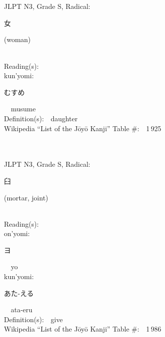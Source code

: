 \begin{multicols}{2}
\ \ \\
{\fontsize{34pt}{40pt}  }\ \ \\  %
{JLPT N3, Grade S, Radical:\ \ {\begin{CJK}{UTF8}{min} 女 \end{CJK}} (woman) } \\
Reading(s):\ \ \\
{\hspace*{1em}}kun'yomi:\ \ \\
{\hspace*{2em}}{\begin{CJK}{UTF8}{min} むすめ \end{CJK}}\ \ musume\ \ \\
Definition(s):\ \ daughter \\
Wikipedia ``List of the J\=oy\=o Kanji'' Table \#:\ \ 1\,925 \\
\ \ \\
{\fontsize{34pt}{40pt}  }\ \ \\  %
{JLPT N3, Grade S, Radical:\ \ {\begin{CJK}{UTF8}{min} 臼 \end{CJK}} (mortar, joint) } \\
Reading(s):\ \ \\
{\hspace*{1em}}on'yomi:\ \ \\
{\hspace*{2em}}{\begin{CJK}{UTF8}{min} ヨ \end{CJK}}\ \ yo\ \ \\
{\hspace*{1em}}kun'yomi:\ \ \\
{\hspace*{2em}}{\begin{CJK}{UTF8}{min} あた-える \end{CJK}}\ \ ata-eru\ \ \\
Definition(s):\ \ give \\
Wikipedia ``List of the J\=oy\=o Kanji'' Table \#:\ \ 1\,986 \\
\ \ \\
{\fontsize{34pt}{40pt}  }\ \ \\  %

\end{multicols}
